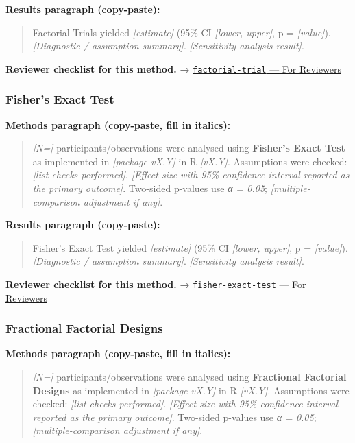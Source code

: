 \documentclass[
]{article}
\begin{document}
\textbf{Results paragraph (copy-paste):}

\begin{quote}
Factorial Trials yielded \emph{{[}estimate{]}} (95\% CI \emph{{[}lower,
upper{]}}, p = \emph{{[}value{]}}). \emph{{[}Diagnostic / assumption
summary{]}}. \emph{{[}Sensitivity analysis result{]}}.
\end{quote}

\textbf{Reviewer checklist for this method.} →
\href{../chapters/14-clinical/factorial-trial.Rmd\#for-reviewers}{\texttt{factorial-trial}
--- For Reviewers}

\subsubsection{Fisher's Exact Test}\label{fishers-exact-test}

\textbf{Methods paragraph (copy-paste, fill in italics):}

\begin{quote}
\emph{{[}N={]}} participants/observations were analysed using
\textbf{Fisher's Exact Test} as implemented in \emph{{[}package vX.Y{]}}
in R \emph{{[}vX.Y{]}}. Assumptions were checked: \emph{{[}list checks
performed{]}}. \emph{{[}Effect size with 95\% confidence interval
reported as the primary outcome{]}}. Two-sided p-values use \emph{α =
0.05}; \emph{{[}multiple-comparison adjustment if any{]}}.
\end{quote}

\textbf{Results paragraph (copy-paste):}

\begin{quote}
Fisher's Exact Test yielded \emph{{[}estimate{]}} (95\% CI
\emph{{[}lower, upper{]}}, p = \emph{{[}value{]}}). \emph{{[}Diagnostic
/ assumption summary{]}}. \emph{{[}Sensitivity analysis result{]}}.
\end{quote}

\textbf{Reviewer checklist for this method.} →
\href{../chapters/04-inferential/fisher-exact-test.Rmd\#for-reviewers}{\texttt{fisher-exact-test}
--- For Reviewers}

\subsubsection{Fractional Factorial
Designs}\label{fractional-factorial-designs}

\textbf{Methods paragraph (copy-paste, fill in italics):}

\begin{quote}
\emph{{[}N={]}} participants/observations were analysed using
\textbf{Fractional Factorial Designs} as implemented in \emph{{[}package
vX.Y{]}} in R \emph{{[}vX.Y{]}}. Assumptions were checked: \emph{{[}list
checks performed{]}}. \emph{{[}Effect size with 95\% confidence interval
reported as the primary outcome{]}}. Two-sided p-values use \emph{α =
0.05}; \emph{{[}multiple-comparison adjustment if any{]}}.
\end{quote}
\end{document}
